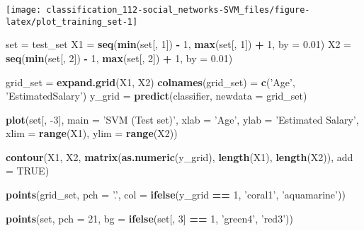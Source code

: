 \documentclass[]{book}
\newenvironment{Shaded}{\begin{snugshade}}{\end{snugshade}}
\newcommand{\DataTypeTok}[1]{\textcolor[rgb]{0.13,0.29,0.53}{#1}}
\newcommand{\DecValTok}[1]{\textcolor[rgb]{0.00,0.00,0.81}{#1}}
\newcommand{\FloatTok}[1]{\textcolor[rgb]{0.00,0.00,0.81}{#1}}
\newcommand{\KeywordTok}[1]{\textcolor[rgb]{0.13,0.29,0.53}{\textbf{#1}}}
\newcommand{\NormalTok}[1]{#1}
\newcommand{\OperatorTok}[1]{\textcolor[rgb]{0.81,0.36,0.00}{\textbf{#1}}}
\newcommand{\OtherTok}[1]{\textcolor[rgb]{0.56,0.35,0.01}{#1}}
\newcommand{\StringTok}[1]{\textcolor[rgb]{0.31,0.60,0.02}{#1}}
\begin{document}
\begin{center}\texttt{[image: classification\_112-social\_networks-SVM\_files/figure-latex/plot\_training\_set-1]} \end{center}

\begin{Shaded}
\begin{Highlighting}[]
\NormalTok{set =}\StringTok{ }\NormalTok{test_set }
\NormalTok{X1 =}\StringTok{ }\KeywordTok{seq}\NormalTok{(}\KeywordTok{min}\NormalTok{(set[, }\DecValTok{1}\NormalTok{]) }\OperatorTok{-}\StringTok{ }\DecValTok{1}\NormalTok{, }\KeywordTok{max}\NormalTok{(set[, }\DecValTok{1}\NormalTok{]) }\OperatorTok{+}\StringTok{ }\DecValTok{1}\NormalTok{, }\DataTypeTok{by =} \FloatTok{0.01}\NormalTok{) }
\NormalTok{X2 =}\StringTok{ }\KeywordTok{seq}\NormalTok{(}\KeywordTok{min}\NormalTok{(set[, }\DecValTok{2}\NormalTok{]) }\OperatorTok{-}\StringTok{ }\DecValTok{1}\NormalTok{, }\KeywordTok{max}\NormalTok{(set[, }\DecValTok{2}\NormalTok{]) }\OperatorTok{+}\StringTok{ }\DecValTok{1}\NormalTok{, }\DataTypeTok{by =} \FloatTok{0.01}\NormalTok{) }
  
\NormalTok{grid_set =}\StringTok{ }\KeywordTok{expand.grid}\NormalTok{(X1, X2) }
\KeywordTok{colnames}\NormalTok{(grid_set) =}\StringTok{ }\KeywordTok{c}\NormalTok{(}\StringTok{'Age'}\NormalTok{, }\StringTok{'EstimatedSalary'}\NormalTok{) }
\NormalTok{y_grid =}\StringTok{ }\KeywordTok{predict}\NormalTok{(classifier, }\DataTypeTok{newdata =}\NormalTok{ grid_set) }
  
\KeywordTok{plot}\NormalTok{(set[, }\DecValTok{-3}\NormalTok{], }\DataTypeTok{main =} \StringTok{'SVM (Test set)'}\NormalTok{, }
     \DataTypeTok{xlab =} \StringTok{'Age'}\NormalTok{, }\DataTypeTok{ylab =} \StringTok{'Estimated Salary'}\NormalTok{, }
     \DataTypeTok{xlim =} \KeywordTok{range}\NormalTok{(X1), }\DataTypeTok{ylim =} \KeywordTok{range}\NormalTok{(X2)) }
  
\KeywordTok{contour}\NormalTok{(X1, X2, }\KeywordTok{matrix}\NormalTok{(}\KeywordTok{as.numeric}\NormalTok{(y_grid), }\KeywordTok{length}\NormalTok{(X1), }\KeywordTok{length}\NormalTok{(X2)), }\DataTypeTok{add =} \OtherTok{TRUE}\NormalTok{) }
  
\KeywordTok{points}\NormalTok{(grid_set, }\DataTypeTok{pch =} \StringTok{'.'}\NormalTok{, }\DataTypeTok{col =} \KeywordTok{ifelse}\NormalTok{(y_grid }\OperatorTok{==}\StringTok{ }\DecValTok{1}\NormalTok{, }\StringTok{'coral1'}\NormalTok{, }\StringTok{'aquamarine'}\NormalTok{)) }
  
\KeywordTok{points}\NormalTok{(set, }\DataTypeTok{pch =} \DecValTok{21}\NormalTok{, }\DataTypeTok{bg =} \KeywordTok{ifelse}\NormalTok{(set[, }\DecValTok{3}\NormalTok{] }\OperatorTok{==}\StringTok{ }\DecValTok{1}\NormalTok{, }\StringTok{'green4'}\NormalTok{, }\StringTok{'red3'}\NormalTok{)) }
\end{Highlighting}
\end{Shaded}
\end{document}
